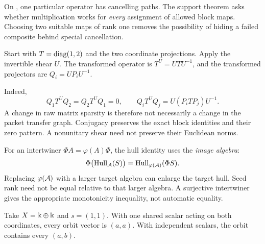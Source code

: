 On , one particular operator has cancelling paths. The support theorem asks whether multiplication works for \emph{every} assignment of allowed block maps. Choosing two suitable maps of rank one removes the possibility of hiding a failed composite behind special cancellation.


Start with $T=\diag(1,2)$ and the two coordinate projections. Apply the invertible shear $U$. The transformed operator is $T^U=UTU^{-1}$, and the transformed projectors are $Q_i=UP_iU^{-1}$.


Indeed,
\[
Q_1T^UQ_2=Q_2T^UQ_1=0,
\qquad
Q_iT^UQ_j=U(P_iTP_j)U^{-1}.
\]
A change in raw matrix sparsity is therefore not necessarily a change in the packet transfer graph. Conjugacy preserves the exact block identities and their zero pattern. A nonunitary shear need not preserve their Euclidean norms.

For an intertwiner $\Phi A=\varphi(A)\Phi$, the hull identity uses the \emph{image algebra}:
\[
\Phi\bigl(\Hull_{\AA}(S)\bigr)=\Hull_{\varphi(\AA)}(\Phi S).
\]
Replacing $\varphi(\AA)$ with a larger target algebra can enlarge the target hull. Seed rank need not be equal relative to that larger algebra. A surjective intertwiner gives the appropriate monotonicity inequality, not automatic equality.


Take $X=\kk\oplus\kk$ and $s=(1,1)$. With one shared scalar acting on both coordinates, every orbit vector is $(a,a)$. With independent scalars, the orbit contains every $(a,b)$.

